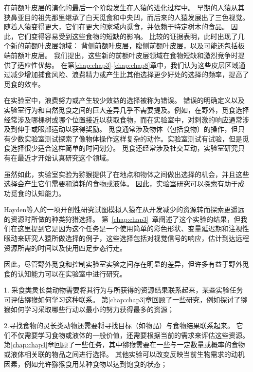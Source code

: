 在前额叶皮层的演化的最后一个阶段发生在人猿的进化过程中。
早期的人猿从其狭鼻亚目的祖先那里继承了白天觅食和中央凹，而后来的人猿发展出了三色视觉。
随着人猿变得更大，它们在更大的家域内觅食，并依赖于特定树木的食品。
因此，它们变得容易受到这些食物的短缺的影响。
比较的证据表明，此时出现了几个新的前额叶皮层领域：
背侧前额叶皮层，腹侧前额叶皮层，以及可能还包括极端前额叶皮层。
我们提出，这些新的前额叶皮层领域在食物短缺和激烈竞争时提供了适应性优势。
在第\ref{chap:chap3}-\ref{chap:chap8}章中，我们认为这些皮层区域通过减少增加捕食风险、浪费精力或产生比其他选择更少好处的选择的频率，提高了觅食的效率。


在实验室中，浪费努力或产生较少效益的选择被称为错误。
错误的明确定义以及实验室行为和自然觅食之间的巨大差异几乎不需要提及。例如，在野外，觅食选择经常涉及哪棵树或哪个位置接近以获取食物，而在实验室中，对刺激的响应通常涉及到伸手或眼部运动以获得奖励。
觅食通常涉及物体（包括食物）的操作，但只有少数实验室测试探索了像物体操作这样复杂的动作。实验室测试有试验，但是觅食选择很少适合这样简单的时间划分。
觅食还经常涉及社交互动，实验室研究只有在最近才开始认真研究这个领域。


虽然如此，实验室实验为猕猴提供了在地点和物体之间做出选择的机会，并且这些选择会产生它们需要和消耗的食物或液体。
因此，实验室研究可以探索有助于成功觅食的认知能力。


Hayden等人\cite{hayden2011surprise}的一项开创性研究试图模拟人猿在从开发减少的资源转而探索更遥远的资源时所做的种类狩猎选择。
第~\ref{chap:chap3}~章阐述了这个实验的结果，但我们在这里提到它是因为这个任务是一个使用简单的彩色形状、变量延迟期和注视性眼动来研究人猿所做选择的例子，这些选择包括对视觉信号的响应，估计到达远程资源所需的时间以及使用四足步态行走。


因此，尽管野外觅食和控制实验室实验之间存在明显的差异，但许多有益于野外觅食的认知能力可以在实验室中进行研究。


1. 采食类灵长类动物需要将其行为与所获得的资源结果联系起来，某些实验任务可评估猕猴如何学习这种联系。
第\ref{chap:chap3}章回顾了一些研究，例如探讨了猕猴如何学习采取哪些行动以最小的努力获得最多的资源；\par


2.寻找食物的灵长类动物还需要将寻找目标（如物品）与食物结果联系起来。
它们不仅需要学习食物或液体的一般价值，还需要根据当前的需求来评估这些资源。
第\ref{chap:chap4}章回顾了一些任务，其中猕猴需要在一些与一定数量或概率的食物或液体相关联的物品之间进行选择。
其他实验可以改变反映当前生物需求的动机因素，例如允许猕猴食用某种食物以达到饱食的状态；\par


